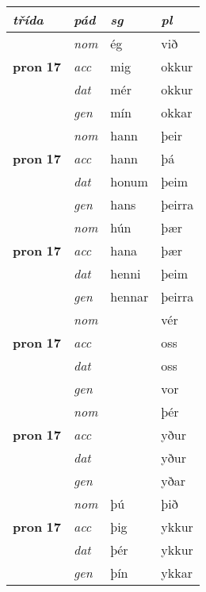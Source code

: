 \begin{center}
\begin{minipage}[t]{.45\textwidth}
\begin{tabular}{l>{\footnotesize\itshape}l>{\small}l>{\small}l}
 {\textbf{\textit{třída}}} & {\textit{pád}}   & \textit{sg} & \textit{pl}  \\ 
 \hline
\multirow{3}{*}{{{\textbf{pron} \Large{\textbf{17}}}}}  &  nom & ég & við   \\*
 & acc &  mig  & okkur  \\*
 & dat & mér & okkur   \\*
 & gen & mín  & okkar  \\
\hline

\multirow{3}{*}{{{\textbf{pron} \Large{\textbf{17}}}}}  &  nom & hann & þeir   \\*
 & acc &  hann  & þá  \\*
 & dat & honum & þeim   \\*
 & gen & hans  & þeirra  \\
\hline

\multirow{3}{*}{{{\textbf{pron} \Large{\textbf{17}}}}}  &  nom & hún & þær   \\*
 & acc &  hana  & þær  \\*
 & dat & henni & þeim   \\*
 & gen & hennar  & þeirra  \\
\hline

\multirow{3}{*}{{{\textbf{pron} \Large{\textbf{17}}}}}  &  nom &  & vér   \\*
 & acc &    & oss  \\*
 & dat &  & oss   \\*
 & gen &   & vor  \\
\hline

\multirow{3}{*}{{{\textbf{pron} \Large{\textbf{17}}}}}  &  nom &  & þér   \\*
 & acc &    & yður  \\*
 & dat &  & yður   \\*
 & gen &   & yðar  \\
\hline

\multirow{3}{*}{{{\textbf{pron} \Large{\textbf{17}}}}}  &  nom & þú & þið   \\*
 & acc &  þig  & ykkur  \\*
 & dat & þér & ykkur   \\*
 & gen & þín  & ykkar  \\
\hline


\end{tabular}
\end{minipage}
\end{center}
